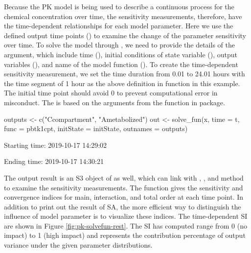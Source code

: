Because the PK model is being used to describe a continuous process for
the chemical concentration over time, the sensitivity measurements,
therefore, have the time-dependent relationships for each model
parameter. Here we use the defined output time points () to
examine the change of the parameter sensitivity over time. To solve the
model through , we need to provide the details of the
argument, which include time (), initial conditions of state
variable (), output variables (), and
name of the model function (). To create the time-dependent
sensitivity measurement, we set the time duration from 0.01 to 24.01
hours with the time segment of 1 hour as the above definition in
 function in this example. The initial time point should avoid
0 to prevent computational error in misconduct. The  is
based on the arguments from the  function in 
package.

\begin{Schunk}
\begin{Sinput}
outputs <- c("Ccompartment", "Ametabolized")
out <- solve_fun(x, time = t, func = pbtk1cpt, 
                 initState = initState, outnames = outputs)
\end{Sinput}
\begin{Soutput}
  Starting time: 2019-10-17 14:29:02
\end{Soutput}
\begin{Soutput}
  Ending time: 2019-10-17 14:30:21
\end{Soutput}
\end{Schunk}

The output result  is an S3 object of  as well,
which can link with , , and  method
to examine the sensitivity measurements. The  function gives
the sensitivity and convergence indices for main, interaction, and total
order at each time point. In addition to print out the result of SA, the
more efficient way to distinguish the influence of model parameter is to
visualize these indices. The time-dependent SI are shown in Figure
\ref{fig:pk-solvefun-rest}. The SI has computed range from 0 (no impact)
to 1 (high impact) and represents the contribution percentage of output
variance under the given parameter distributions.


